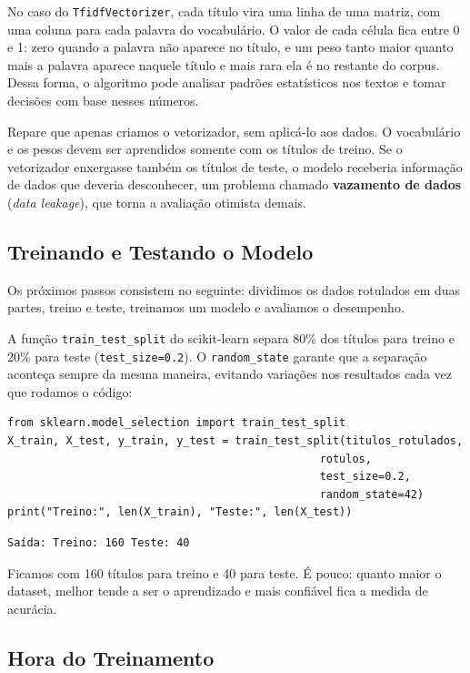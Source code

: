 \documentclass[a4paper,12pt,openany]{book}
\begin{document}
No caso do \texttt{TfidfVectorizer}, cada título vira uma linha de uma matriz, com uma coluna para cada palavra do vocabulário. O valor de cada célula fica entre 0 e 1: zero quando a palavra não aparece no título, e um peso tanto maior quanto mais a palavra aparece naquele título e mais rara ela é no restante do corpus. Dessa forma, o algoritmo pode analisar padrões estatísticos nos textos e tomar decisões com base nesses números.

Repare que apenas criamos o vetorizador, sem aplicá-lo aos dados. O vocabulário e os pesos devem ser aprendidos somente com os títulos de treino. Se o vetorizador enxergasse também os títulos de teste, o modelo receberia informação de dados que deveria desconhecer, um problema chamado \textbf{vazamento de dados} (\textit{data leakage}), que torna a avaliação otimista demais.

\subsection{Treinando e Testando o Modelo}
Os próximos passos consistem no seguinte: dividimos os dados rotulados em duas partes, treino e teste, treinamos um modelo e avaliamos o desempenho.

A função \texttt{train\_test\_split} do scikit-learn separa 80\% dos títulos para treino e 20\% para teste (\texttt{test\_size=0.2}). O \texttt{random\_state} garante que a separação aconteça sempre da mesma maneira, evitando variações nos resultados cada vez que rodamos o código:
\begin{verbatim}
from sklearn.model_selection import train_test_split
X_train, X_test, y_train, y_test = train_test_split(titulos_rotulados, 
                                                rotulos, 
                                                test_size=0.2, 
                                                random_state=42)
print("Treino:", len(X_train), "Teste:", len(X_test))
\end{verbatim}
\begin{verbatim}
Saída: Treino: 160 Teste: 40
\end{verbatim}
Ficamos com 160 títulos para treino e 40 para teste. É pouco: quanto maior o dataset, melhor tende a ser o aprendizado e mais confiável fica a medida de acurácia.

\subsection{Hora do Treinamento}
\end{document}
